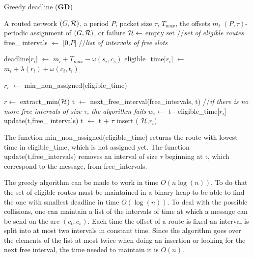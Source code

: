 \documentclass[10pt, conference, letterpaper]{IEEEtran}
\begin{document}
    
     \begin{algorithm}
    \caption{ Greedy deadline ({\bf GD}) }
    \begin{algorithmic}
    \REQUIRE A routed network $(G,{\cal R})$, a period $P$, packet size $\tau$, $ T_{max}$, the offsets $m_i$
    \ENSURE $(P,\tau)$-periodic assignment of $(G,{\cal R})$, or failure
   \STATE  ${\cal H} \leftarrow$ empty set //{\em set of eligible routes}
       \STATE  free\_ intervals $\leftarrow$ [0,$P$] //{\em list of intervals of free slots}
  
    \STATE  deadline[$r_i$]  $\leftarrow$  $m_{i} + T_{max} - \omega(s_i,c_s)$
    \STATE  eligible\_time[$r_i$] $\leftarrow$ $m_{i} +  \lambda(r_i) + \omega(c_t,t_i)$
      \ENDFOR
      
      \STATE $r_i$ $\leftarrow $ min\_non\_assigned(eligible\_time)
      \ENDIF
     
      \STATE $r \leftarrow $ extract\_min(${\cal H}$)
      \STATE t $\leftarrow$ next\_free\_interval(free\_intervals, t) //{\em if there is no more free intervals of size $\tau$, the algorithm fails}
      \STATE $w_i \leftarrow$ t - eligible\_time[$r_i$]
      \STATE update(t,free\_ intervals)
      \STATE t $\leftarrow$ t + $\tau$
      \STATE insert ( ${\cal H}$,$r_i$).
      \ENDFOR
      \ENDWHILE
    

    \end{algorithmic}
    \end{algorithm}
    The function  min\_non\_assigned(eligible\_time) returns the route with lowest time in eligible\_time, which is not assigned yet. The function update(t,free\_intervals) removes an interval of size $\tau$ beginning at t, which correspond to the message,  from free\_intervals.


    The greedy algorithm can be made to work in time $O(n\log(n))$. 
    To do that the set of eligible routes must be maintained in a binary heap
    to be able to find the one with smallest deadline in time $O(\log(n))$. 
    To deal with the possible collisions, one can maintain a list of the intervals
    of time at which a message can be send on the arc $(c_t,c_s)$. Each time the offset of a 
    route is fixed an interval is split into at most two intervals in constant time. 
    Since the algorithm goes over the elements of the list at most twice when doing an insertion
    or looking for the next free interval, the time needed to maintain it is $O(n)$. 
    
\end{document}
